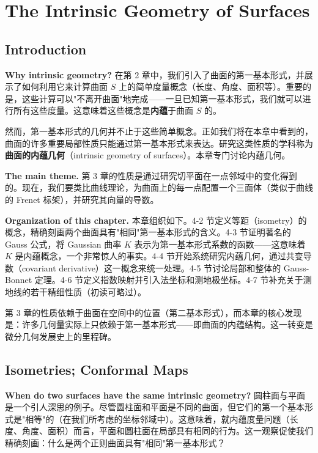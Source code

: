 \chapter{The Intrinsic Geometry of Surfaces}\label{chap:intrinsic-geometry}

\section{Introduction}\label{sec:intro-ch4}

\textbf{Why intrinsic geometry?} 在第 2 章中，我们引入了曲面的第一基本形式，并展示了如何利用它来计算曲面 $S$ 上的简单度量概念（长度、角度、面积等）。重要的是，这些计算可以"不离开曲面"地完成——一旦已知第一基本形式，我们就可以进行所有这些度量。这意味着这些概念是\textbf{内蕴}于曲面 $S$ 的。

然而，第一基本形式的几何并不止于这些简单概念。正如我们将在本章中看到的，曲面的许多重要局部性质只能通过第一基本形式来表达。研究这类性质的学科称为\textbf{曲面的内蕴几何}（intrinsic geometry of surfaces）。本章专门讨论内蕴几何。

\textbf{The main theme.} 第 3 章的性质是通过研究切平面在一点邻域中的变化得到的。现在，我们要类比曲线理论，为曲面上的每一点配置一个三面体（类似于曲线的 Frenet 标架），并研究其向量的导数。

\textbf{Organization of this chapter.} 本章组织如下。4-2 节定义等距（isometry）的概念，精确刻画两个曲面具有"相同"第一基本形式的含义。4-3 节证明著名的 Gauss 公式，将 Gaussian 曲率 $K$ 表示为第一基本形式系数的函数——这意味着 $K$ 是内蕴概念，一个非常惊人的事实。4-4 节开始系统研究内蕴几何，通过共变导数（covariant derivative）这一概念来统一处理。4-5 节讨论局部和整体的 Gauss-Bonnet 定理。4-6 节定义指数映射并引入法坐标和测地极坐标。4-7 节补充关于测地线的若干精细性质（初读可略过）。

\begin{Remark}
第 3 章的性质依赖于曲面在空间中的位置（第二基本形式），而本章的核心发现是：许多几何量实际上只依赖于第一基本形式——即曲面的内蕴结构。这一转变是微分几何发展史上的里程碑。
\end{Remark}

\section{Isometries; Conformal Maps}\label{sec:isometries}

\textbf{When do two surfaces have the same intrinsic geometry?} 圆柱面与平面是一个引人深思的例子。尽管圆柱面和平面是不同的曲面，但它们的第一个基本形式是"相等"的（在我们所考虑的坐标邻域中）。这意味着，就内蕴度量问题（长度、角度、面积）而言，平面和圆柱面在局部具有相同的行为。这一观察促使我们精确刻画：什么是两个正则曲面具有"相同"第一基本形式？

